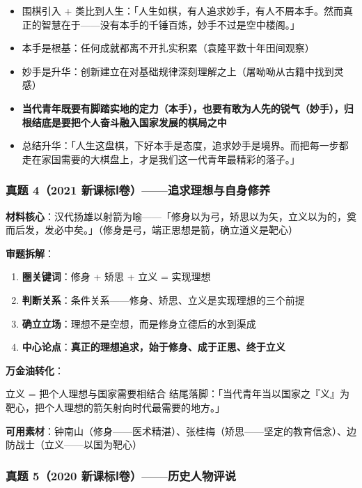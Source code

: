 \begin{itemize}
  \item[\textbf{开头}] 围棋引入 + 类比到人生：「人生如棋，有人追求妙手，有人不屑本手。然而真正的智慧在于——没有本手的千锤百炼，妙手不过是空中楼阁。」
  \item[\textbf{分论点 1}] 本手是根基：任何成就都离不开扎实积累（袁隆平数十年田间观察）
  \item[\textbf{分论点 2}] 妙手是升华：创新建立在对基础规律深刻理解之上（屠呦呦从古籍中找到灵感）
  \item[\textbf{分论点 3}] \textbf{当代青年既要有脚踏实地的定力（本手），也要有敢为人先的锐气（妙手），归根结底是要把个人奋斗融入国家发展的棋局之中}
  \item[\textbf{结尾}] 总结升华：「人生这盘棋，下好本手是态度，追求妙手是境界。而把每一步都走在家国需要的大棋盘上，才是我们这一代青年最精彩的落子。」
\end{itemize}

\subsubsection{真题 4（2021 新课标Ⅰ卷）——追求理想与自身修养}

\textbf{材料核心}：汉代扬雄以射箭为喻——「修身以为弓，矫思以为矢，立义以为的，奠而后发，发必中矣。」（修身是弓，端正思想是箭，确立道义是靶心）

\textbf{审题拆解}：

\begin{enumerate}
  \item \textbf{圈关键词}：修身 + 矫思 + 立义 = 实现理想
  \item \textbf{判断关系}：条件关系——修身、矫思、立义是实现理想的三个前提
  \item \textbf{确立立场}：理想不是空想，而是修身立德后的水到渠成
  \item \textbf{中心论点}：\textbf{真正的理想追求，始于修身、成于正思、终于立义}
\end{enumerate}

\textbf{万金油转化}：

立义 = 把个人理想与国家需要相结合
结尾落脚：「当代青年当以国家之『义』为靶心，把个人理想的箭矢射向时代最需要的地方。」

\textbf{可用素材}：钟南山（修身——医术精湛）、张桂梅（矫思——坚定的教育信念）、边防战士（立义——以国为靶心）

\subsubsection{真题 5（2020 新课标Ⅰ卷）——历史人物评说}

